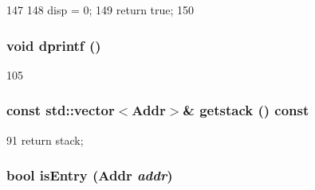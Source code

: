 \begin{DoxyCode}
147     {
148         disp = 0;
149         return true;
150     }
\end{DoxyCode}
\hypertarget{classX86ISA_1_1StackTrace_a70fdc8802b54b4244889a2d3553405d5}{
\subsubsection[{dprintf}]{\setlength{\rightskip}{0pt plus 5cm}void dprintf ()}}
\label{classX86ISA_1_1StackTrace_a70fdc8802b54b4244889a2d3553405d5}



\begin{DoxyCode}
105 {}
\end{DoxyCode}
\hypertarget{classX86ISA_1_1StackTrace_aceb93ba31a3756aca859b4643efeeb46}{
\subsubsection[{getstack}]{\setlength{\rightskip}{0pt plus 5cm}const {\bf std::vector}$<${\bf Addr}$>$\& getstack () const}}
\label{classX86ISA_1_1StackTrace_aceb93ba31a3756aca859b4643efeeb46}



\begin{DoxyCode}
91 { return stack; }
\end{DoxyCode}
\hypertarget{classX86ISA_1_1StackTrace_a8c9787d05f9c0e82dfcaf31cf0fd4b50}{
\subsubsection[{isEntry}]{\setlength{\rightskip}{0pt plus 5cm}bool isEntry ({\bf Addr} {\em addr})}}
\label{classX86ISA_1_1StackTrace_a8c9787d05f9c0e82dfcaf31cf0fd4b50}



